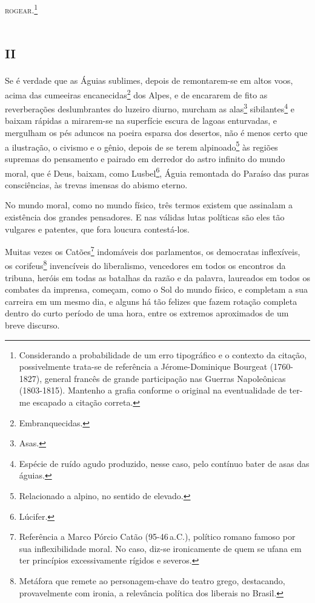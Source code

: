 \textsc{rogear}.\footnote{Considerando a probabilidade de um erro tipográfico e
  o contexto da citação, possivelmente trata-se de referência a
  Jérome-Dominique Bourgeat (1760-1827), general francês de grande
  participação nas Guerras Napoleônicas (1803-1815). Mantenho a grafia
  conforme o original na eventualidade de ter-me escapado a citação
  correta.\label{rogear}}

\section{\textsc{ii}}

Se é verdade que as Águias sublimes, depois de remontarem-se em altos
voos, acima das cumeeiras encanecidas\footnote{Embranquecidas.} dos
Alpes, e de encararem de fito as reverberações deslumbrantes do luzeiro
diurno, murcham as alas\footnote{Asas.} sibilantes\footnote{Espécie
  de ruído agudo produzido, nesse caso, pelo contínuo bater de asas das
  águias.} e baixam rápidas a mirarem-se na superfície escura de lagoas
enturvadas, e mergulham os pés aduncos na poeira esparsa dos desertos,
não é menos certo que a ilustração, o civismo e o gênio, depois de se
terem alpinoado\footnote{Relacionado a alpino, no sentido de elevado.}
às regiões supremas do pensamento e pairado em derredor do astro
infinito do mundo moral, que é Deus, baixam, como Lusbel\footnote{Lúcifer.}, 
Águia remontada do Paraíso das puras consciências, às
trevas imensas do abismo eterno.

No mundo moral, como no mundo físico, três termos existem que assinalam
a existência dos grandes pensadores. E nas válidas lutas políticas são
eles tão vulgares e patentes, que fora loucura contestá-los.

Muitas vezes os Catões\footnote{Referência a Marco Pórcio Catão (95-46\,a.C.), 
político romano famoso por sua inflexibilidade moral. No
  caso, diz-se ironicamente de quem se ufana em ter princípios
  excessivamente rígidos e severos.\label{marco}} indomáveis dos parlamentos, os
democratas inflexíveis, os corifeus\footnote{Metáfora que remete ao
  personagem-chave do teatro grego, destacando, provavelmente com
  ironia, a relevância política dos liberais no Brasil.} invencíveis do
liberalismo, vencedores em todos os encontros da tribuna, heróis em
todas as batalhas da razão e da palavra, laureados em todos os combates
da imprensa, começam, como o Sol do mundo físico, e completam a sua
carreira em um mesmo dia, e alguns há tão felizes que fazem rotação
completa dentro do curto período de uma hora, entre os extremos
aproximados de um breve discurso.

